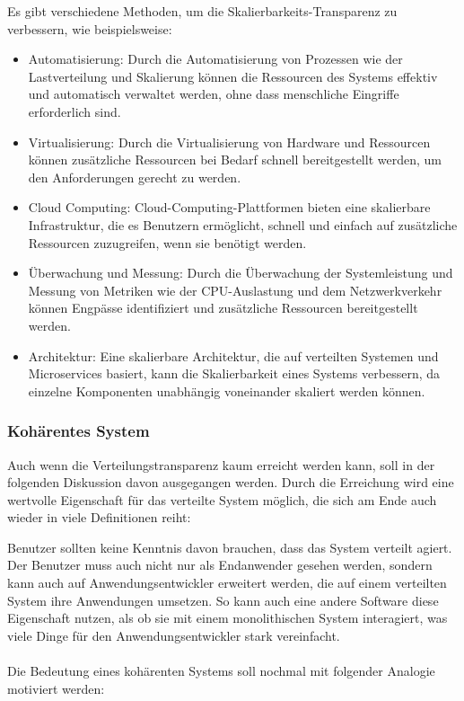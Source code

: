 \documentclass[../vs-script-first-v01.tex]{subfiles}
\begin{document}
\begin{itemize}
Es gibt verschiedene Methoden, um die Skalierbarkeits-Transparenz zu verbessern, wie beispielsweise:
\begin{itemize}
\item Automatisierung: Durch die Automatisierung von Prozessen wie der Lastverteilung und Skalierung können die Ressourcen des Systems effektiv und automatisch verwaltet werden, ohne dass menschliche Eingriffe erforderlich sind.
\item Virtualisierung: Durch die Virtualisierung von Hardware und Ressourcen können zusätzliche Ressourcen bei Bedarf schnell bereitgestellt werden, um den Anforderungen gerecht zu werden.
\item Cloud Computing: Cloud-Computing-Plattformen bieten eine skalierbare Infrastruktur, die es Benutzern ermöglicht, schnell und einfach auf zusätzliche Ressourcen zuzugreifen, wenn sie benötigt werden.
\item Überwachung und Messung: Durch die Überwachung der Systemleistung und Messung von Metriken wie der CPU-Auslastung und dem Netzwerkverkehr können Engpässe identifiziert und zusätzliche Ressourcen bereitgestellt werden.
\item Architektur: Eine skalierbare Architektur, die auf verteilten Systemen und Microservices basiert, kann die Skalierbarkeit eines Systems verbessern, da einzelne Komponenten unabhängig voneinander skaliert werden können.
\end{itemize}

\end{itemize}	
\subsubsection{Kohärentes System}
Auch wenn die Verteilungstransparenz kaum erreicht werden kann, soll in der folgenden Diskussion davon ausgegangen werden. Durch die Erreichung wird eine wertvolle Eigenschaft für das verteilte System möglich, die sich am Ende auch wieder in viele Definitionen reiht: 

\mbox{}Benutzer sollten keine Kenntnis davon brauchen, dass das System verteilt agiert. Der Benutzer muss auch nicht nur als Endanwender gesehen werden, sondern kann auch auf Anwendungsentwickler erweitert werden, die auf einem verteilten System ihre Anwendungen umsetzen. 
So kann auch eine andere Software diese Eigenschaft nutzen, als ob sie mit einem monolithischen System interagiert, was viele Dinge für den Anwendungsentwickler stark vereinfacht. 
\\\\
Die Bedeutung eines kohärenten Systems soll nochmal mit folgender Analogie motiviert werden:
\end{document}
